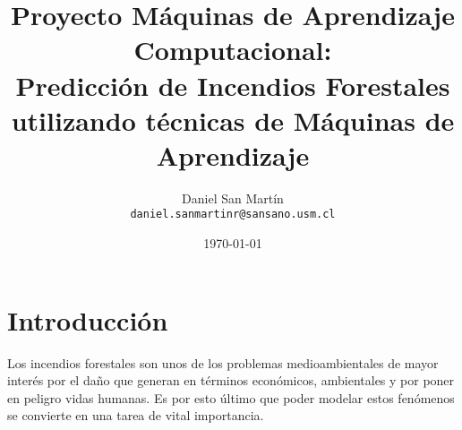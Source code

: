 \documentclass[spanish]{article}
\title{Proyecto Máquinas de Aprendizaje Computacional: \\
	\large{Predicción de Incendios Forestales utilizando técnicas de Máquinas de Aprendizaje}}
\author{Daniel San Martín \\ 
	\texttt{daniel.sanmartinr@sansano.usm.cl}
}
\date{\today}
\begin{document}
	\renewcommand{\BOthers}[1]{et al.\hbox{}}
	\maketitle

    
    \section{Introducción}
    

            Los incendios forestales son unos de los problemas medioambientales de mayor interés por el daño que generan
            en términos económicos, ambientales y por poner en peligro vidas humanas. %
            Es por esto último que poder modelar estos fenómenos se convierte en una tarea de vital importancia. \\
            
            
            
\end{document}
